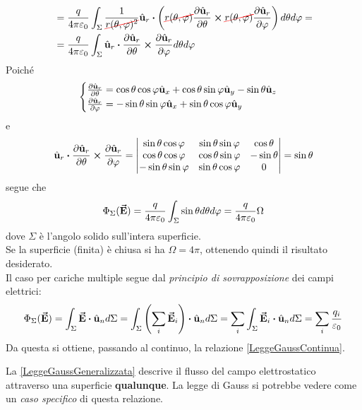 \begin{demonstration}
\begin{align*}
	&=\frac{q}{4\pi\epsilon_0}\int_{\Sigma}\frac{1}{\Ccancel[red]{r(\theta,\phi)^2}}\vbh{u}_r\vdot\left(\Ccancel[red]{r(\theta,\phi)}\pdv{\vbh{u}_r}{\theta}\cross \Ccancel[red]{r(\theta,\phi)}\pdv{\vbh{u}_r}{\phi}\right)d\theta d\phi=\\
	&=\frac{q}{4\pi\epsilon_0}\int_{\Sigma}\vbh{u}_r\vdot\pdv{\vbh{u}_r}{\theta}\cross\pdv{\vbh{u}_r}{\phi}d\theta d\phi
\end{align*}
Poiché
\begin{equation*}
	\begin{cases}
		\pdv{\hat{\mathbf{u}}_r}{\theta}=\cos\theta\cos\varphi\hat{\mathbf{u}}_x+\cos\theta\sin\varphi\hat{\mathbf{u}}_y-\sin\theta\hat{\mathbf{u}}_z\\
		\pdv{\hat{\mathbf{u}}_r}{\varphi}=-\sin\theta\sin\varphi\hat{\mathbf{u}}_x+\sin\theta\cos\varphi\hat{\mathbf{u}}_y\\
\end{cases}
\end{equation*}
e
\begin{equation*}
	\vbh{u}_r\vdot\pdv{\vbh{u}_r}{\theta}\cross\pdv{\vbh{u}_r}{\phi}=\begin{vmatrix}
		\sin\theta\cos\phi & \sin\theta\sin\phi & \cos\theta\\
		\cos\theta\cos\phi & \cos\theta\sin\phi & -\sin\theta\\
		-\sin\theta\sin\phi & \sin\theta\cos\phi & 0
	\end{vmatrix}=\sin\theta
\end{equation*}
segue che
\begin{equation}
	\Phi_{\Sigma}(\vb*{\va{E}})=\frac{q}{4\pi\varepsilon_0}\int_{\Sigma}\sin\theta d\theta d\varphi=\frac{q}{4\pi\varepsilon_0}\Omega\label{LeggeGaussGeneralizzata}
\end{equation}
dove $\Sigma$ è l'angolo solido sull'intera superficie.\\
Se la superficie (finita) è chiusa si ha $\Omega=4\pi$, ottenendo quindi il risultato desiderato.\\
Il caso per cariche multiple segue dal \textit{principio di sovrapposizione} dei campi elettrici:
\begin{equation*}
	\Phi_{\Sigma}(\vba{E})=\int_{\Sigma} \vba{E}\vdot \vbh{u}_nd\Sigma=\int_{\Sigma}\left(\sum_i\vba{E}_i\right)\vdot\vbh{u}_nd\Sigma=\sum_i\int_{\Sigma}\vba{E}_i\vdot\vbh{u}_nd\Sigma=\sum_i\frac{q_i}{\epsilon_0}
\end{equation*}
Da questa si ottiene, passando al continuo, la relazione \eqref{LeggeGaussContinua}.
\end{demonstration}
\begin{observe}
	La \eqref{LeggeGaussGeneralizzata} descrive il flusso del campo elettrostatico attraverso una superficie \textbf{qualunque}. La legge di Gauss si potrebbe vedere come un \textit{caso specifico} di questa relazione.
\end{observe}
